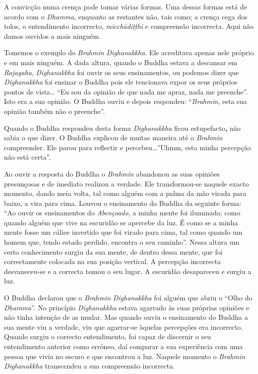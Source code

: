 A convicção numa crença pode tomar várias formas. Uma dessas formas está
de acordo com o \emph{Dhamma}, enquanto as restantes não, tais como; a
crença cega dos tolos, o entendimento incorrecto, \emph{micchādițțhi} e
compreensão incorrecta. Aqui não damos ouvidos a mais ninguém.

Tomemos o exemplo do \emph{Brahmin} \emph{Dighanakkha}. Ele acreditava
apenas nele próprio e em mais ninguém. A dada altura, quando o Buddha
estava a descansar em \emph{Rajagaha}, \emph{Dighanakkha} foi ouvir os
seus ensinamentos, ou podemos dizer que \emph{Dighanakkha} foi ensinar o
Buddha pois ele tencionava expor os seus próprios pontos de
vista\ldots{} ``Eu sou da opinião de que nada me apraz, nada me
preenche''. Isto era a sua opinião. O Buddha ouviu e depois respondeu:
``\emph{Brahmin}, esta sua opinião também não o preenche''.

Quando o Buddha respondeu desta forma \emph{Dighanakkha} ficou
estupefacto\textbf{,} não sabia o que dizer. O Buddha explicou de muitas
maneira até o \emph{Brahmin} compreender. Ele parou para reflectir e
percebeu\ldots{}''Uhmm, esta minha percepção não está certa''.

Ao ouvir a resposta do Buddha o \emph{Brahmin} abandonou as suas
opiniões presunçosas e de imediato realizou a verdade. Ele
transformou-se naquele exacto momento, dando meia volta, tal como alguém
com a palma da mão virada para baixo, a vira para cima. Louvou o
ensinamento do Buddha da seguinte forma: ``Ao ouvir os ensinamentos do
\emph{Abençoado}, a minha mente foi iluminada; como quando alguém que
vive na escuridão se apercebe da luz. É como se a minha mente fosse um
cálice invertido que foi virado para cima, tal como quando um homem que,
tendo estado perdido, encontra o seu caminho''. Nessa altura um certo
conhecimento surgiu da sua mente, de dentro dessa mente, que foi
correctamente colocada na sua posição vertical. A percepção incorrecta
desvaneceu-se e a correcta tomou o seu lugar. A escuridão desapareceu e
surgiu a luz.

O Buddha declarou que o \emph{Brahmin} \emph{Dighanakkha} foi alguém que
abriu o ``Olho do \emph{Dhamma}''. No princípio \emph{Dighanakkha}
estava agarrado às suas próprias opiniões e não tinha intenção de as
mudar. Mas quando ouviu o ensinamento do Buddha a sua mente viu a
verdade, viu que agarrar-se àquelas percepções era incorrecto. Quando
surgiu o correcto entendimento, foi capaz de discernir o seu
entendimento anterior como erróneo, daí comparar a sua experiência com
uma pessoa que vivia no escuro e que encontrou a luz. Naquele momento o
\emph{Brahmin} \emph{Dighanakkha} transcendeu a sua compreensão
incorrecta.

